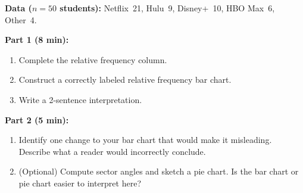 \documentclass[aspectratio=169, 11pt]{beamer}
\begin{document}
{
\begin{frame}[t, plain]
  \vspace{1.2cm}\par
  \hspace{0.55cm}%
  \begin{minipage}{0.9\textwidth}
    \small

    \textbf{Data ($n = 50$ students):}
    Netflix~21, Hulu~9, Disney+~10, HBO Max~6, Other~4.

    \vspace{0.35cm}
    \textbf{Part 1 (8 min):}
    \begin{enumerate}
      \setlength{\itemsep}{0.3em}
      \item Complete the relative frequency column.
      \item Construct a correctly labeled relative frequency bar chart.
      \item Write a 2-sentence interpretation.
    \end{enumerate}

    \vspace{0.35cm}
    \textbf{Part 2 (5 min):}
    \begin{enumerate}
      \setlength{\itemsep}{0.3em}
      \item Identify one change to your bar chart that would make it misleading.
            Describe what a reader would incorrectly conclude.
      \item (Optional) Compute sector angles and sketch a pie chart.
            Is the bar chart or pie chart easier to interpret here?
    \end{enumerate}
  \end{minipage}
\end{frame}
}
\end{document}
